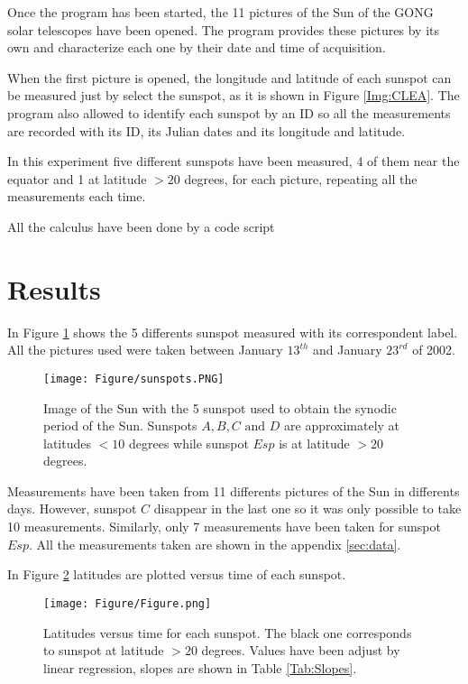 \documentclass[twoside]{article}
\begin{document}
\begin{multicols}{2}
			Once the program has been started, the 11 pictures of the Sun of the GONG solar telescopes have been opened. The program provides these pictures by its own and characterize each one by their date and time of acquisition.

			When the first picture is opened, the longitude and latitude of each sunspot can be measured just by select the sunspot, as it is shown in Figure \ref{Img:CLEA}. The program also allowed to identify each sunspot by an ID so all the measurements are recorded with its ID, its Julian dates and its longitude and latitude.

			In this experiment five different sunspots have been measured, 4 of them near the equator and 1 at latitude $>20$ degrees, for each picture, repeating all the measurements each time.

			All the calculus have been done by a code script \cite{github}

		\section{Results}

			In Figure \ref{Img:sunspot} shows the 5 differents sunspot measured with its correspondent label. All the pictures used were taken between January $13^{th}$ and January $23^{rd}$ of 2002.	

				\begin{figure}[H]
					\centering
					\texttt{[image: Figure/sunspots.PNG]}
					\caption{\label{Img:sunspot}Image of the Sun with the 5 sunspot used to obtain the synodic period of the Sun. Sunspots $A,B,C \textrm{ and }D$ are approximately at latitudes $<10$ degrees while sunspot $Esp$ is at latitude $>20$ degrees.}
				\end{figure}

			Measurements have been taken from 11 differents pictures of the Sun in differents days. However, sunspot $C$ disappear in the last one so it was only possible to take 10 measurements. Similarly, only 7 measurements have been taken for sunspot $Esp$. All the measurements taken are shown in the appendix \ref{sec:data}. 

			In Figure \ref{Img:Slopes} latitudes are plotted versus time of each sunspot.

				\begin{figure}[H]
					\centering
					\texttt{[image: Figure/Figure.png]}
					\caption{\label{Img:Slopes}Latitudes versus time for each sunspot. The black one corresponds to sunspot at latitude $>20$ degrees. Values have been adjust by linear regression, slopes are shown in Table \ref{Tab:Slopes}.}
				\end{figure}


\end{multicols}
\end{document}
